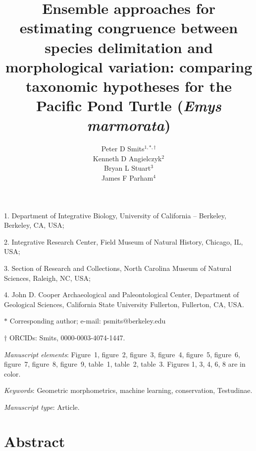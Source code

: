 \documentclass[11pt]{article}
\title{Ensemble approaches for estimating congruence between species delimitation and morphological variation: comparing taxonomic hypotheses for the Pacific Pond Turtle (\textit{Emys marmorata})}
\author{Peter D Smits$^{1,\ast,\dag}$ \\ 
Kenneth D Angielczyk$^{2}$ \\ 
Bryan L Stuart$^{3}$ \\
James F Parham$^{4}$}
\date{}
\begin{document}


\maketitle

\noindent{}1. Department of Integrative Biology, University of California -- Berkeley, Berkeley, CA, USA;

\noindent{}2. Integrative Research Center, Field Museum of Natural History, Chicago, IL, USA;

\noindent{}3. Section of Research and Collections, North Carolina Museum of Natural Sciences, Raleigh, NC, USA;

\noindent{}4. John D. Cooper Archaeological and Paleontological Center, Department of Geological Sciences, California State University Fullerton, Fullerton, CA, USA.


\noindent{}$\ast$ Corresponding author; e-mail: psmits@berkeley.edu

\noindent{}$\dag$ ORCIDs: Smits, 0000-0003-4074-1447.

\bigskip

\textit{Manuscript elements}: Figure~1, figure~2, figure~3, figure~4, figure~5, figure~6, figure~7, figure~8, figure~9, table~1, table~2, table~3. Figures 1, 3, 4, 6, 8 are in color.

\bigskip

\textit{Keywords}: Geometric morphometrics, machine learning, conservation, Testudinae.

\bigskip

\textit{Manuscript type}: Article. 

\bigskip


\linenumbers{}
\modulolinenumbers[3]

\newpage{}

\section*{Abstract}
\end{document}
